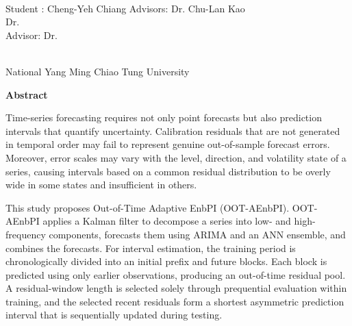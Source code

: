 \begin{center}
    \large
    
    \begin{singlespace}
        \textbf{\englishTitle{}} \\[0.5cm]
    \end{singlespace}
    
    \begin{singlespace}
        Student : Cheng-Yeh Chiang\studentEnName{}  \hspace{1.0cm} 
        \ifdefined\advisorCnNameB
            Advisors: Dr. Chu-Lan Kao\, \advisorEnName \\
            \hspace{6.6cm} Dr.\, \advisorEnNameB  \\
        \else
            Advisor: Dr.\, \advisorEnName \\
        \fi
    \end{singlespace}
    
    \vspace{0.5cm}
    \begin{singlespace}
        \NameofDepartmentInstituteEN\\
        National Yang Ming Chiao Tung University\\[0.2cm]
    \end{singlespace}
    
    \textbf{Abstract} \\[0.5cm]

\end{center}

\normalsize 
  
Time-series forecasting requires not only point forecasts but also prediction intervals that quantify uncertainty. Calibration residuals that are not generated in temporal order may fail to represent genuine out-of-sample forecast errors. Moreover, error scales may vary with the level, direction, and volatility state of a series, causing intervals based on a common residual distribution to be overly wide in some states and insufficient in others.

This study proposes Out-of-Time Adaptive EnbPI (OOT-AEnbPI). OOT-AEnbPI applies a Kalman filter to decompose a series into low- and high-frequency components, forecasts them using ARIMA and an ANN ensemble, and combines the forecasts. For interval estimation, the training period is chronologically divided into an initial prefix and future blocks. Each block is predicted using only earlier observations, producing an out-of-time residual pool. A residual-window length is selected solely through prequential evaluation within training, and the selected recent residuals form a shortest asymmetric prediction interval that is sequentially updated during testing.

